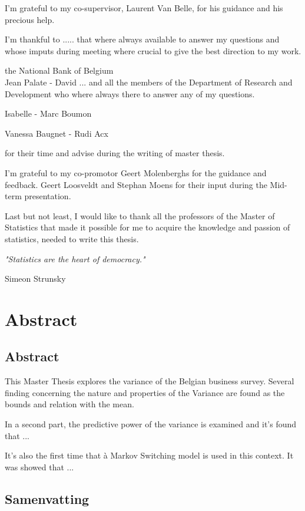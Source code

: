 \documentclass[12pt,a4paper,oneside]{book}
\newenvironment{bottompar}{\par\vspace*{\fill}}{\clearpage}
\begin{document}
I'm grateful to my co-supervisor, Laurent Van Belle, for his guidance and his precious help.

I'm thankful to ..... that where always available to answer my questions and whose imputs during meeting where crucial to give the best direction to my work.

the National Bank of Belgium \\

Jean Palate - David ... 
and all the members of the Department of Research and Development who where always there to answer any of my questions.

Isabelle - Marc Boumon

Vanessa Baugnet - Rudi Acx 

for their time and advise during the writing of master thesis. 

I'm grateful to my co-promotor Geert Molenberghs for the guidance and feedback. Geert Loosveldt and Stephan Moens for their input during the Mid-term presentation.

Last but not least, I would like to thank all the professors of the Master of Statistics that made it possible for me to acquire the knowledge and passion of statistics, needed to write this thesis.


\begin{bottompar}
\textit{"Statistics are the heart of democracy." }

    Simeon Strunsky
\end{bottompar}


\chapter*{Abstract}


\section*{Abstract}
This Master Thesis explores the variance of the Belgian business survey. 
Several finding concerning the nature and properties of the Variance are found as the bounds and relation with the mean.

In a second part, the predictive power of the variance is examined and it's found that ...

It's also the first time that à Markov Switching model is used in this context. It was showed that ...


\section*{Samenvatting}
\end{document}
